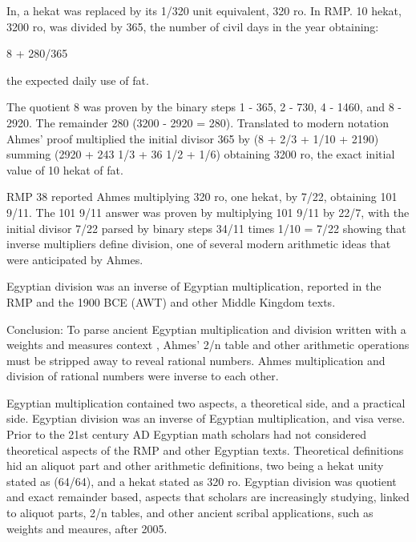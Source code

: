 \documentclass[12pt]{article}
\begin{document}
In,  a hekat was replaced by its 1/320 unit equivalent, 320 ro. In RMP. 10 hekat, 3200 ro, was divided by 365, the number of civil days in the year obtaining: 

8 + 280/365

the expected daily use of fat.

The quotient 8 was proven by the binary steps 1 - 365, 2 - 730, 4 - 1460, and 8 - 2920. The  remainder 280 (3200 - 2920 = 280). Translated to modern notation  Ahmes' proof multiplied the initial divisor 365 by (8 + 2/3 + 1/10 + 2190) summing (2920 + 243 1/3 + 36 1/2 + 1/6) obtaining 3200 ro, the exact initial value of 10 hekat of fat.     

RMP 38 reported Ahmes multiplying 320 ro, one hekat, by 7/22, obtaining 101 9/11. The 101 9/11 answer was proven by multiplying 101 9/11 by 22/7, with the initial divisor 7/22 parsed by binary steps 34/11 times 1/10 = 7/22 showing that inverse multipliers define division, one of several modern arithmetic ideas that were anticipated by Ahmes.

Egyptian division was an inverse of Egyptian multiplication, reported in the RMP and the 1900 BCE  (AWT) and other Middle Kingdom texts. 

Conclusion: To parse ancient Egyptian multiplication and division written with a weights and measures context , Ahmes' 2/n table and other arithmetic operations must be stripped away to reveal rational numbers. Ahmes multiplication and division of rational numbers were inverse to each other.

Egyptian multiplication contained two aspects, a theoretical side, and a practical side. Egyptian division was an inverse of Egyptian multiplication, and visa verse. Prior to the 21st century AD Egyptian math scholars had not considered theoretical aspects of the RMP and other Egyptian texts. Theoretical definitions hid an aliquot part and other arithmetic  definitions, two being a hekat unity stated as (64/64), and a hekat stated as 320 ro. Egyptian division was quotient and exact remainder based, aspects that scholars are increasingly studying, linked to aliquot parts, 2/n tables, and other ancient scribal applications, such as weights and meaures, after 2005.
 


\end{document}
